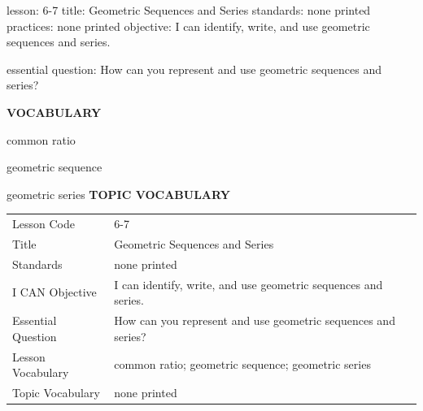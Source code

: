 \documentclass{article}
\newenvironment{lesson-meta}{}{}        %
\newcommand{\te}[1]{}                   %
\begin{document}
\begin{lesson-meta}
lesson: 6-7
title: Geometric Sequences and Series
standards: none printed
practices: none printed
objective: I can identify, write, and use geometric sequences and series.

essential question: How can you represent and use geometric sequences and series?

\textbf{VOCABULARY}
\item common ratio
\item geometric sequence
\item geometric series
\textbf{TOPIC VOCABULARY}
\te{No separate topic vocabulary list is printed on these lesson pages.}
\begin{tabular}{ll}
Lesson Code & 6-7 \\
Title & Geometric Sequences and Series \\
Standards & none printed \\
I CAN Objective & I can identify, write, and use geometric sequences and series. \\
Essential Question & How can you represent and use geometric sequences and series? \\
Lesson Vocabulary & common ratio; geometric sequence; geometric series \\
Topic Vocabulary & none printed \\
\end{tabular}
\end{lesson-meta}
\end{document}
